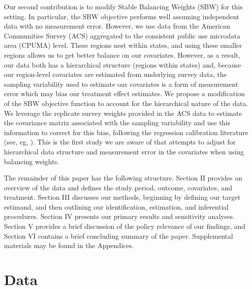 \documentclass[12pt]{article}
\begin{document}
Our second contribution is to modify Stable Balancing Weights (SBW) for this setting. In particular, the SBW objective performs well assuming independent data with no measurement error. However, we use data from the American Communities Survey (ACS) aggregated to the consistent public use microdata area (CPUMA) level. These regions nest within states, and using these smaller regions allows us to get better balance on our covariates. However, as a result, our data both has a hierarchical structure (regions within states) and, because our region-level covariates are estimated from underlying survey data, the sampling variability used to estimate our covariates is a form of measurement error which may bias our treatment effect estimates. We propose a modification of the SBW objective function to account for the hierarchical nature of the data. We leverage the replicate survey weights provided in the ACS data to estimate the covariance matrix associated with the sampling variability and use this information to correct for this bias, following the regression calibration literature (see, eg, \cite{gleser1992importance}). This is the first study we are aware of that attempts to adjust for hierarchical data structure and measurement error in the covariates when using balancing weights. 

The remainder of this paper has the following structure. Section II provides an overview of the data and defines the study period, outcome, covariates, and treatment. Section III discusses our methods, beginning by defining our target estimand, and then outlining our identification, estimation, and inferential procedures. Section IV presents our primary results and sensitivity analyses. Section V provides a brief discussion of the policy relevance of our findings, and Section VI contains a brief concluding summary of the paper. Supplemental materials may be found in the Appendices.

\section{Data}
\end{document}
